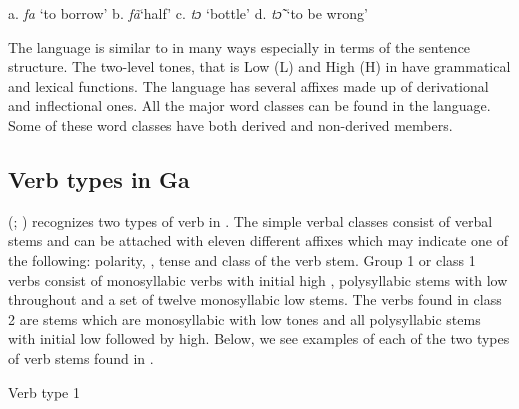 \documentclass[output=paper
,newtxmath
,modfonts
,nonflat]{langsci/langscibook}
\begin{document}
\ea \label{ex:ollennu:1} a. \textit{fa} \enspace `to borrow'  \enspace b. \textit{fã}\enspace `half' \enspace c. \textit{tɔ} \enspace `bottle' \enspace d. \textit{tɔ̃} \enspace `to be wrong'
\z


The language is similar to  in many ways especially in terms of the sentence structure. The two-level tones, that is Low (L) and High (H) in  have grammatical and lexical functions. The language has several affixes made up of derivational and inflectional ones. All the major word classes can be found in the language. Some of these word classes have both derived and non-derived members.

\subsection{\label{sec:ollennu:1.2} Verb types in Ga}

\citeauthor{Dakubu1970}  (\citeyear{Dakubu1970}; \citeyear{Dakubu2003}) recognizes two types of verb in . The simple verbal classes consist of verbal stems and can be attached with eleven different affixes which may indicate one of the following: polarity, , tense and class of the verb stem. Group 1 or class 1 verbs consist of monosyllabic verbs with initial high , polysyllabic stems with low  throughout and a set of twelve monosyllabic low  stems. The verbs found in class 2 are stems which are monosyllabic with low tones and all polysyllabic stems with initial low  followed by high. Below, we see examples of each of the two types of verb stems found in .

\medskip
Verb type 1
\medskip
\end{document}
